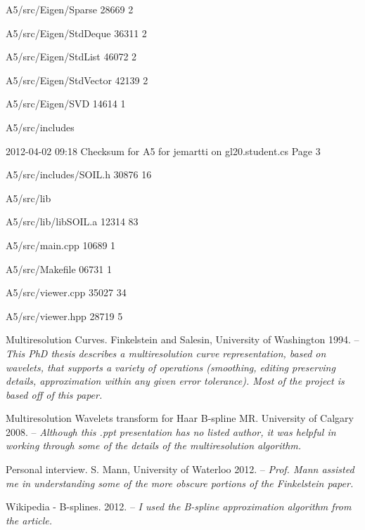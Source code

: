 \documentclass[11pt]{article}
\begin{document}
\begin{flushleft}
{A5/src/Eigen/Sparse                     28669     2

A5/src/Eigen/StdDeque                   36311     2

A5/src/Eigen/StdList                    46072     2

A5/src/Eigen/StdVector                  42139     2

A5/src/Eigen/SVD                        14614     1

A5/src/includes                         

2012-04-02 09:18 Checksum for A5 for jemartti on gl20.student.cs  Page 3

A5/src/includes/SOIL.h                  30876    16

A5/src/lib                              

A5/src/lib/libSOIL.a                    12314    83

A5/src/main.cpp                         10689     1

A5/src/Makefile                         06731     1

A5/src/viewer.cpp                       35027    34

A5/src/viewer.hpp                       28719     5
}
\end{flushleft}

\newpage

\begin{thebibliography}{4}

Multiresolution Curves. Finkelstein and Salesin, University of Washington 1994. – \emph{This PhD thesis describes a multiresolution curve representation, based on wavelets, that supports a variety of operations (smoothing, editing preserving details, approximation within any given error tolerance). Most of the project is based off of this paper.}

Multiresolution Wavelets transform for Haar B-spline MR. University of Calgary 2008. – \emph{Although this .ppt presentation has no listed author, it was helpful in working through some of the details of the multiresolution algorithm.}

Personal interview. S. Mann, University of Waterloo 2012. – \emph{Prof. Mann assisted me in understanding some of the more obscure portions of the Finkelstein paper.}

Wikipedia - B-splines. 2012. – \emph{I used the B-spline approximation algorithm from the article.}

\end{thebibliography}
\end{document}
